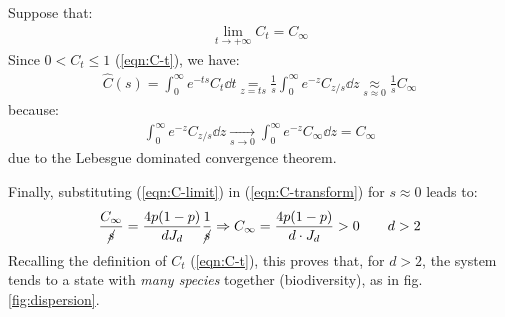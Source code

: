 \documentclass[../../main.tex]{subfiles}
\begin{document}
Suppose that:
\begin{align*}
    \lim_{t \to +\infty} C_t = C_\infty
\end{align*}
Since $0 < C_t \leq 1$ (\ref{eqn:C-t}), we have:
\begin{align}\label{eqn:C-limit}
    \hat{C}(s) = \int_0^\infty e^{-ts} C_t \dd{t} \underset{z = ts}{=} \frac{1}{s} \int_0^\infty e^{-z} C_{z/s} \dd{z}   \underset{s \approx 0}{\approx} \frac{1}{s} C_\infty
\end{align}
because:
\begin{align*}
    \int_0^\infty e^{-z} C_{z/s} \dd{z} \xrightarrow[s \to 0]{} \int_0^\infty e^{-z} C_{\infty} \dd{z} = C_\infty
\end{align*}
due to the Lebesgue dominated convergence theorem.

\medskip

Finally, substituting (\ref{eqn:C-limit}) in (\ref{eqn:C-transform}) for $s \approx 0$ leads to:
\begin{align*}
    \frac{C_\infty}{\cancel{s}} =  \frac{4p(1-p)}{d J_d} \frac{1}{\cancel{s}} \Rightarrow C_{\infty} = \frac{4 p(1-p)}{d \cdot J_d} > 0 \qquad d > 2
\end{align*}
Recalling the definition of $C_t$ (\ref{eqn:C-t}), this proves that, for $d > 2$, the system tends to a state with \textit{many species}  together (biodiversity), as in fig. \ref{fig:dispersion}.

\medskip
\end{document}
